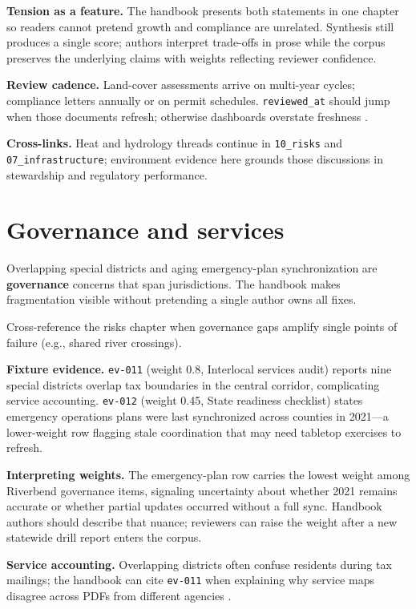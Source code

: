 \documentclass[
]{article}
\begin{document}
\textbf{Tension as a feature.} The handbook presents both statements in
one chapter so readers cannot pretend growth and compliance are
unrelated. Synthesis still produces a single score; authors interpret
trade-offs in prose while the corpus preserves the underlying claims
with weights reflecting reviewer confidence.

\textbf{Review cadence.} Land-cover assessments arrive on multi-year
cycles; compliance letters annually or on permit schedules.
\texttt{reviewed\_at} should jump when those documents refresh;
otherwise dashboards overstate freshness \citep{edwards2010}.

\textbf{Cross-links.} Heat and hydrology threads continue in
\texttt{10\_risks} and \texttt{07\_infrastructure}; environment evidence
here grounds those discussions in stewardship and regulatory
performance.

\newpage

\section{Governance and services}\label{governance-and-services}

Overlapping special districts and aging emergency-plan synchronization
are \textbf{governance} concerns that span jurisdictions. The handbook
makes fragmentation visible without pretending a single author owns all
fixes.

Cross-reference the risks chapter when governance gaps amplify single
points of failure (e.g., shared river crossings).

\textbf{Fixture evidence.} \texttt{ev-011} (weight 0.8, Interlocal
services audit) reports nine special districts overlap tax boundaries in
the central corridor, complicating service accounting. \texttt{ev-012}
(weight 0.45, State readiness checklist) states emergency operations
plans were last synchronized across counties in 2021---a lower-weight
row flagging stale coordination that may need tabletop exercises to
refresh.

\textbf{Interpreting weights.} The emergency-plan row carries the lowest
weight among Riverbend governance items, signaling uncertainty about
whether 2021 remains accurate or whether partial updates occurred
without a full sync. Handbook authors should describe that nuance;
reviewers can raise the weight after a new statewide drill report enters
the corpus.

\textbf{Service accounting.} Overlapping districts often confuse
residents during tax mailings; the handbook can cite \texttt{ev-011}
when explaining why service maps disagree across PDFs from different
agencies \citep{star1989}.
\end{document}
